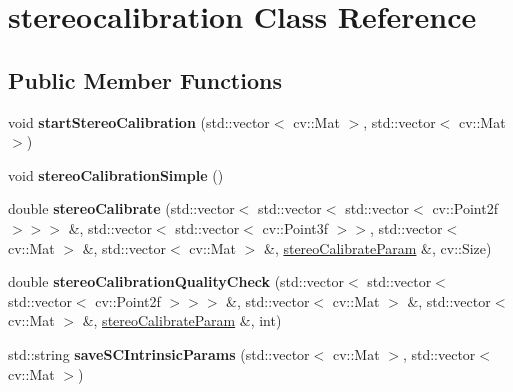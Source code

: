 \hypertarget{classstereocalibration}{}\section{stereocalibration Class Reference}
\label{classstereocalibration}
\subsection*{Public Member Functions}
\begin{DoxyCompactItemize}
\item 
\mbox{\label{classstereocalibration_afe9db633904c17a1fdeb2d447d64ca2f}} 
void {\bfseries start\+Stereo\+Calibration} (std\+::vector$<$ cv\+::\+Mat $>$, std\+::vector$<$ cv\+::\+Mat $>$)
\item 
\mbox{\label{classstereocalibration_a60083d45a44a993aab6ad34449de7783}} 
void {\bfseries stereo\+Calibration\+Simple} ()
\item 
\mbox{\label{classstereocalibration_af4c77e6b722d4dfdb683219d815747c1}} 
double {\bfseries stereo\+Calibrate} (std\+::vector$<$ std\+::vector$<$ std\+::vector$<$ cv\+::\+Point2f $>$$>$$>$ \&, std\+::vector$<$ std\+::vector$<$ cv\+::\+Point3f $>$$>$, std\+::vector$<$ cv\+::\+Mat $>$ \&, std\+::vector$<$ cv\+::\+Mat $>$ \&, \mbox{\hyperlink{structstereo_calibrate_param}{stereo\+Calibrate\+Param}} \&, cv\+::\+Size)
\item 
\mbox{\label{classstereocalibration_a24f5a6156085c208de9ec89e5fc2cecd}} 
double {\bfseries stereo\+Calibration\+Quality\+Check} (std\+::vector$<$ std\+::vector$<$ std\+::vector$<$ cv\+::\+Point2f $>$$>$$>$ \&, std\+::vector$<$ cv\+::\+Mat $>$ \&, std\+::vector$<$ cv\+::\+Mat $>$ \&, \mbox{\hyperlink{structstereo_calibrate_param}{stereo\+Calibrate\+Param}} \&, int)
\item 
\mbox{\label{classstereocalibration_aa6c93add66c90bc625b8452c21b07a85}} 
std\+::string {\bfseries save\+S\+C\+Intrinsic\+Params} (std\+::vector$<$ cv\+::\+Mat $>$, std\+::vector$<$ cv\+::\+Mat $>$)
\item 
\mbox{\label{classstereocalibration_a2461dae2c1a9a8d29d970b9a46fc664f}} 
$$
\end{DoxyCompactItemize}
